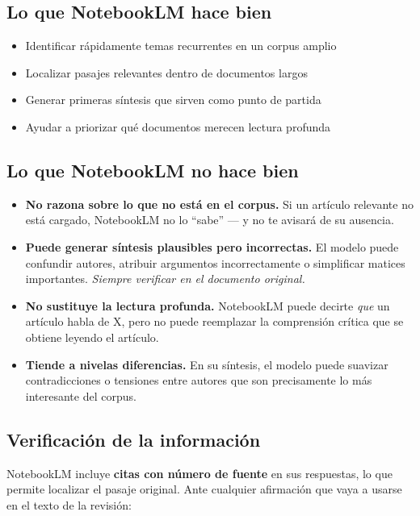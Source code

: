 \documentclass[
]{book}
\providecommand{\tightlist}{%
  \setlength{\itemsep}{0pt}\setlength{\parskip}{0pt}}
\begin{document}
\subsection{Lo que NotebookLM hace bien}\label{lo-que-notebooklm-hace-bien}

\begin{itemize}
\tightlist
\item
  Identificar rápidamente temas recurrentes en un corpus amplio
\item
  Localizar pasajes relevantes dentro de documentos largos
\item
  Generar primeras síntesis que sirven como punto de partida
\item
  Ayudar a priorizar qué documentos merecen lectura profunda
\end{itemize}

\subsection{Lo que NotebookLM no hace bien}\label{lo-que-notebooklm-no-hace-bien}

\begin{itemize}
\tightlist
\item
  \textbf{No razona sobre lo que no está en el corpus.} Si un artículo relevante no está cargado, NotebookLM no lo ``sabe'' --- y no te avisará de su ausencia.
\item
  \textbf{Puede generar síntesis plausibles pero incorrectas.} El modelo puede confundir autores, atribuir argumentos incorrectamente o simplificar matices importantes. \emph{Siempre verificar en el documento original.}
\item
  \textbf{No sustituye la lectura profunda.} NotebookLM puede decirte \emph{que} un artículo habla de X, pero no puede reemplazar la comprensión crítica que se obtiene leyendo el artículo.
\item
  \textbf{Tiende a nivelas diferencias.} En su síntesis, el modelo puede suavizar contradicciones o tensiones entre autores que son precisamente lo más interesante del corpus.
\end{itemize}

\subsection{Verificación de la información}\label{verificaciuxf3n-de-la-informaciuxf3n}

NotebookLM incluye \textbf{citas con número de fuente} en sus respuestas, lo que permite localizar el pasaje original. Ante cualquier afirmación que vaya a usarse en el texto de la revisión:
\end{document}
